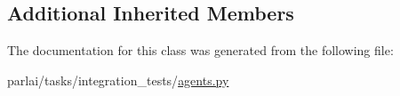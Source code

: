 \subsection*{Additional Inherited Members}


The documentation for this class was generated from the following file\+:\begin{DoxyCompactItemize}
\item 
parlai/tasks/integration\+\_\+tests/\hyperlink{parlai_2tasks_2integration__tests_2agents_8py}{agents.\+py}\end{DoxyCompactItemize}

